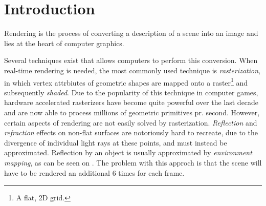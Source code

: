 


\chapter{Introduction}


Rendering is the process of converting a description of a scene into
an image and lies at the heart of computer graphics. 

Several techniques exist that allows computers to perform this
conversion. When real-time rendering is needed, the most commonly used
technique is \textit{rasterization}, in which vertex attrbiutes of
geometric shapes are mapped onto a raster\footnote{A flat, 2D grid.}
and subsequently \textit{shaded}. Due to the popularity of this
technique in computer games, hardware accelerated rasterizers have
become quite powerful over the last decade and are now able to process
millions of geometric primitives pr. second. However, certain aspects
of rendering are not easily solved by rasterization.
\textit{Reflection} and \textit{refraction} effects on non-flat
surfaces are notoriously hard to recreate, due to the divergence of
individual light rays at these points, and must instead be
approximated. Reflection by an object is usually approximated by
\textit{environment mapping}, as can be seen on
. The problem with this approch is that the scene
will have to be rendered an additional 6 times for each frame.

